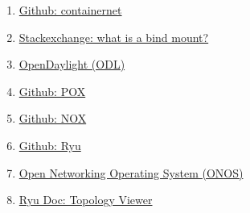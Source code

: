 \documentclass[a4paper, oneside, 12pt]{book}
\begin{document}
\begin{enumerate}
		\item 
		\label{bib: containernet github}
		\href{https://github.com/containernet/containernet}{Github: containernet}
		
		\item 
		\label{bib: what is bind}
		\href{https://unix.stackexchange.com/questions/198590/what-is-a-bind-mount}{Stackexchange: what is a bind mount?}
		
		\item 
		\label{bib: opendaylight}
		\href{https://www.opendaylight.org/}{OpenDaylight (ODL)}
		
		\item 
		\label{bib: pox}
		\href{https://github.com/noxrepo/pox}{Github: POX}
		
		\item 
		\label{bib: nox}
		\href{https://github.com/noxrepo/nox}{Github: NOX}
		
		\item 
		\label{bib: ryu}
		\href{https://github.com/faucetsdn/ryu}{Github: Ryu}
		
		\item 
		\label{bib: onos}
		\href{https://opennetworking.org/onos/}{Open Networking Operating System (ONOS)}
		
		\item
		\label{bib: ryu gui}
		\href{https://ryu.readthedocs.io/en/latest/gui.html}{Ryu Doc: Topology Viewer}
		
		
		
		
	\end{enumerate}

	\vspace{20px}
\end{document}
